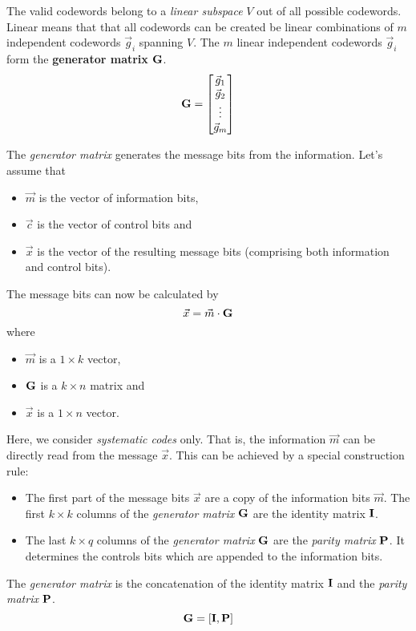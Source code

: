\begin{refsection}
The valid codewords belong to a \emph{linear subspace} $V$ out of all possible codewords. Linear means that that all codewords can be created be linear combinations of $m$ independent codewords $\vec{g}_i$ spanning $V$. The $m$ linear independent codewords $\vec{g}_i$ form the  \textbf{generator matrix} $\bm{\mathrm{G}}$.
\begin{equation}
	\bm{\mathrm{G}} = \left[\begin{matrix}
		\vec{g}_1 \\
		\vec{g}_2 \\
		\vdots \\
		\vec{g}_m
	\end{matrix}\right]
\end{equation}

The \emph{generator matrix} generates the message bits from the information. Let's assume that
\begin{itemize}
	\item $\vec{m}$ is the vector of information bits,
	\item $\vec{c}$ is the vector of control bits and
	\item $\vec{x}$ is the vector of the resulting message bits (comprising both information and control bits).
\end{itemize}
The message bits can now be calculated by
\begin{equation}
	\vec{x} = \vec{m} \cdot \bm{\mathrm{G}}
\end{equation}
where
\begin{itemize}
	\item $\vec{m}$ is a $1 \times k$ vector,
	\item $\bm{\mathrm{G}}$ is a $k \times n$ matrix and
	\item $\vec{x}$ is a $1 \times n$ vector.
\end{itemize}

Here, we consider \emph{systematic codes} only. That is, the information $\vec{m}$ can be directly read from the message $\vec{x}$. This can be achieved by a special construction rule:
\begin{itemize}
	\item The first part of the message bits $\vec{x}$ are a copy of the information bits $\vec{m}$. The first $k \times k$ columns of the \emph{generator matrix} $\bm{\mathrm{G}}$ are the identity matrix $\bm{\mathrm{\mathrm{I}}}$.
	\item The last $k \times q$ columns of the \emph{generator matrix} $\bm{\mathrm{G}}$ are the \emph{parity matrix} $\bm{\mathrm{P}}$. It determines the controls bits which are appended to the information bits.
\end{itemize}
The \emph{generator matrix} is the concatenation of the identity matrix $\bm{\mathrm{\mathrm{I}}}$ and the \emph{parity matrix} $\bm{\mathrm{P}}$.
\begin{equation}
	\bm{\mathrm{G}} = \left[\bm{\mathrm{\mathrm{I}}}, \bm{\mathrm{P}}\right]
\end{equation}


\end{refsection}
